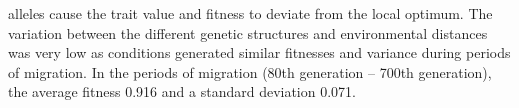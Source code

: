 alleles cause the trait value and fitness to deviate from the local optimum. The variation between the different genetic structures and environmental distances was very low as conditions generated similar fitnesses and variance during periods of migration. In the periods of migration (80th generation – 700th generation), the average fitness 0.916 and a standard deviation 0.071.

